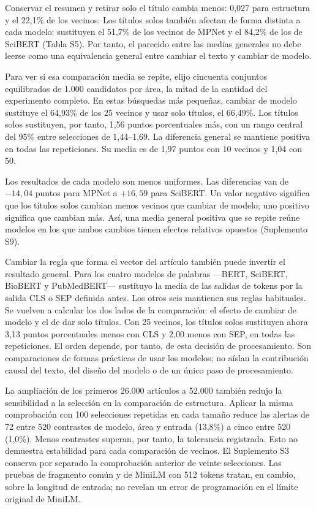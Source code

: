 \documentclass[12pt]{article}
\begin{document}
Conservar el resumen y retirar solo el título cambia menos: 0,027 para estructura y el 22,1\% de los vecinos. Los títulos solos también afectan de forma distinta a cada modelo: sustituyen el 51,7\% de los vecinos de MPNet y el 84,2\% de los de SciBERT (Tabla S5). Por tanto, el parecido entre las medias generales no debe leerse como una equivalencia general entre cambiar el texto y cambiar de modelo.

Para ver si esa comparación media se repite, elijo cincuenta conjuntos equilibrados de 1.000 candidatos por área, la mitad de la cantidad del experimento completo. En estas búsquedas más pequeñas, cambiar de modelo sustituye el 64,93\% de los 25 vecinos y usar solo títulos, el 66,49\%. Los títulos solos sustituyen, por tanto, 1,56 puntos porcentuales más, con un rango central del 95\% entre selecciones de 1,44--1,69. La diferencia general se mantiene positiva en todas las repeticiones. Su media es de 1,97 puntos con 10 vecinos y 1,04 con 50.

Los resultados de cada modelo son menos uniformes. Las diferencias van de $-14,04$ puntos para MPNet a $+16,59$ para SciBERT. Un valor negativo significa que los títulos solos cambian menos vecinos que cambiar de modelo; uno positivo significa que cambian más. Así, una media general positiva que se repite reúne modelos en los que ambos cambios tienen efectos relativos opuestos (Suplemento S9).

Cambiar la regla que forma el vector del artículo también puede invertir el resultado general. Para los cuatro modelos de palabras ---BERT, SciBERT, BioBERT y PubMedBERT--- sustituyo la media de las salidas de tokens por la salida CLS o SEP definida antes. Los otros seis mantienen sus reglas habituales. Se vuelven a calcular los dos lados de la comparación: el efecto de cambiar de modelo y el de dar solo títulos. Con 25 vecinos, los títulos solos sustituyen ahora 3,13 puntos porcentuales menos con CLS y 2,00 menos con SEP, en todas las repeticiones. El orden depende, por tanto, de esta decisión de procesamiento. Son comparaciones de formas prácticas de usar los modelos; no aíslan la contribución causal del texto, del diseño del modelo o de un único paso de procesamiento.

La ampliación de los primeros 26.000 artículos a 52.000 también redujo la sensibilidad a la selección en la comparación de estructura. Aplicar la misma comprobación con 100 selecciones repetidas en cada tamaño reduce las alertas de 72 entre 520 contrastes de modelo, área y entrada (13,8\%) a cinco entre 520 (1,0\%). Menos contrastes superan, por tanto, la tolerancia registrada. Esto no demuestra estabilidad para cada comparación de vecinos. El Suplemento S3 conserva por separado la comprobación anterior de veinte selecciones. Las pruebas de fragmento común y de MiniLM con 512 tokens tratan, en cambio, sobre la longitud de entrada; no revelan un error de programación en el límite original de MiniLM.
\end{document}
